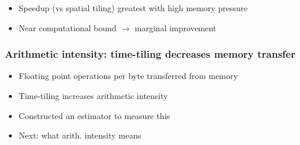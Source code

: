 \documentclass{beamer}
\begin{document}
\begin{frame}
\begin{columns}
\begin{column}{.49\textwidth}
\begin{center}
\end{center}
\end{column}
\end{columns}

\begin{itemize}
	\item Speedup (vs spatial tiling) greatest with high memory pressure
	\item Near computational bound \(\rightarrow\) marginal improvement
\end{itemize}
\end{frame}



\begin{frame}
\frametitle{Arithmetic intensity: time-tiling decreases memory transfer}

\begin{itemize}
	\item Floating point operations per byte transferred from memory
	\newline
	\item Time-tiling increases arithmetic intensity
	\item Constructed an estimator to measure this
	\item Next: what arith. intensity means
\end{itemize}
\end{frame}
\end{document}
